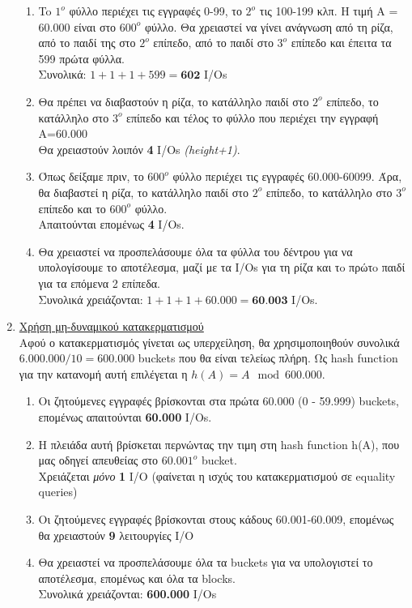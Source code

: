 \documentclass[a4paper,11pt]{article}
\begin{document}
\begin{enumerate}
    \begin{enumerate}
	\item To $1^o$ φύλλο περιέχει τις εγγραφές 0-99, το $2^o$ τις 100-199
	κλπ. Η τιμή Α = 60.000 είναι στο $600^o$ φύλλο. Θα χρειαστεί να γίνει
	ανάγνωση από τη ρίζα, από το παιδί της στο $2^o$ επίπεδο, από το παιδί
	στο $3^o$ επίπεδο και έπειτα τα 599 πρώτα φύλλα.\\
	Συνολικά: $1 + 1 + 1 + 599 = \textbf{602}$ I/Os
	\item Θα πρέπει να διαβαστούν η ρίζα, το κατάλληλο παιδί στο $2^o$
	επίπεδο, το κατάλληλο στο $3^o$ επίπεδο και τέλος το φύλλο που
	περιέχει την εγγραφή Α=60.000\\
	Θα χρειαστούν λοιπόν \textbf{4} I/Os \emph{(height+1)}.
	\item Όπως δείξαμε πριν, το $600^o$ φύλλο περιέχει τις εγγραφές
	60.000-60099. Άρα, θα διαβαστεί η ρίζα, το κατάλληλο παιδί στο $2^o$
	επίπεδο, το κατάλληλο στο $3^o$ επίπεδο και το $600^o$ φύλλο.\\
	Απαιτούνται επομένως \textbf{4} I/Os.
	\item Θα χρειαστεί να προσπελάσουμε όλα τα φύλλα του δέντρου για να
	υπολογίσουμε το αποτέλεσμα, μαζί με τα I/Os για τη ρίζα και τo πρώτo
	παιδί για τα επόμενα 2 επίπεδα.\\
	Συνολικά χρειάζονται: $1 + 1 + 1 + 60.000 = \textbf{60.003}$ I/Os.
    \end{enumerate}
    \pagebreak

    \item \underline{Χρήση μη-δυναμικού κατακερματισμού}\\
    Αφού ο κατακερματισμός γίνεται ως υπερχείληση, θα χρησιμοποιηθούν συνολικά
    $6.000.000 / 10 = 600.000$ buckets που θα είναι τελείως πλήρη. Ως hash
    function για την κατανομή αυτή επιλέγεται η $h(A) = A \mod 600.000$.
    \begin{enumerate}
	\item Οι ζητούμενες εγγραφές βρίσκονται στα πρώτα 60.000 (0 - 59.999)
	buckets, επομένως απαιτούνται \textbf{60.000} I/Os.
	\item Η πλειάδα αυτή βρίσκεται περνώντας την τιμη στη hash function
	h(A), που μας οδηγεί απευθείας στο $60.001^o$ bucket.\\
	Χρειάζεται \emph{μόνο} \textbf{1} I/O (φαίνεται η ισχύς του
	κατακερματισμού σε equality queries)
	\item Οι ζητούμενες εγγραφές βρίσκονται στους κάδους 60.001-60.009,
	επομένως θα χρειαστούν \textbf{9} λειτουργίες I/O
	\item Θα χρειαστεί να προσπελάσουμε όλα τα buckets για να υπολογιστεί
	το αποτέλεσμα, επομένως και όλα τα blocks.\\
	Συνολικά χρειάζονται: \textbf{600.000} I/Os
    \end{enumerate}
\end{enumerate}
\end{document}
